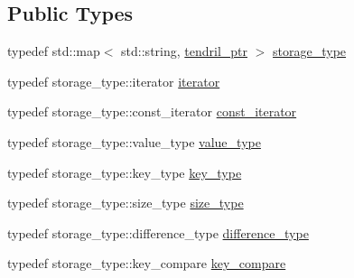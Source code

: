 \subsection*{Public Types}
\begin{DoxyCompactItemize}
\item 
typedef std\+::map$<$ std\+::string, \hyperlink{namespaceecto_a84fb5f6130275382e5cbeb5fdececa78}{tendril\+\_\+ptr} $>$ \hyperlink{classecto_1_1tendrils_a3647503829f1b29de220584d265c63fb}{storage\+\_\+type}
\item 
typedef storage\+\_\+type\+::iterator \hyperlink{classecto_1_1tendrils_a6f0b7bd6e3a03f047351303630b889e0}{iterator}
\item 
typedef storage\+\_\+type\+::const\+\_\+iterator \hyperlink{classecto_1_1tendrils_a86df9983555ca4ebdae8b1d36aa4bbd8}{const\+\_\+iterator}
\item 
typedef storage\+\_\+type\+::value\+\_\+type \hyperlink{classecto_1_1tendrils_a736870868e76890e198448924cecdd4f}{value\+\_\+type}
\item 
typedef storage\+\_\+type\+::key\+\_\+type \hyperlink{classecto_1_1tendrils_aa6165c6ab72d93cd56796ea81e450245}{key\+\_\+type}
\item 
typedef storage\+\_\+type\+::size\+\_\+type \hyperlink{classecto_1_1tendrils_af3726f822a4fd60a1095bba31f1926ef}{size\+\_\+type}
\item 
typedef storage\+\_\+type\+::difference\+\_\+type \hyperlink{classecto_1_1tendrils_a919b9a4666ad641148b6a432a1fd08fb}{difference\+\_\+type}
\item 
typedef storage\+\_\+type\+::key\+\_\+compare \hyperlink{classecto_1_1tendrils_aa347bebda44153437e8554a25bed9e6b}{key\+\_\+compare}
\end{DoxyCompactItemize}
